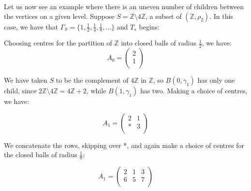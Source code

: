 \begin{example}
Let us now see an example where there is an uneven number of children between the vertices on a given level. Suppose $S=\mathbb{Z} \setminus 4\mathbb{Z}$, a subset of $(\mathbb{Z}, \rho_2)$. In this case, we have that $\Gamma_S=\{1, \frac{1}{2},\frac{1}{4},\frac{1}{8},\ldots \}$ and $T_s$ begins:

\begin{center}
\end{center}

Choosing centres for the partition of $\mathbb{Z}$ into closed balls of radius $\frac{1}{2}$, we have:
\[A_0=
 \begin{pmatrix}
2 \\
1  \\
\end{pmatrix}
\]

We have taken $S$ to be the complement of $4\mathbb{Z}$ in $\mathbb{Z}$, so $B(0,\gamma_1)$ has only one child, since $2\mathbb{Z} \setminus 4\mathbb{Z} = 4\mathbb{Z}+2$, while $B(1,\gamma_1)$ has two. Making a choice of centres, we have:

\[A_1=
 \begin{pmatrix}
2 & 1 \\
* & 3  \\
\end{pmatrix}
\]

We concatenate the rows, skipping over *, and again make a choice of centres for the closed balls of radius $\frac{1}{8}$:

\[A_1=
 \begin{pmatrix}
2 & 1 & 3 \\
6 & 5 & 7   \\
\end{pmatrix}
\]


\end{example}
